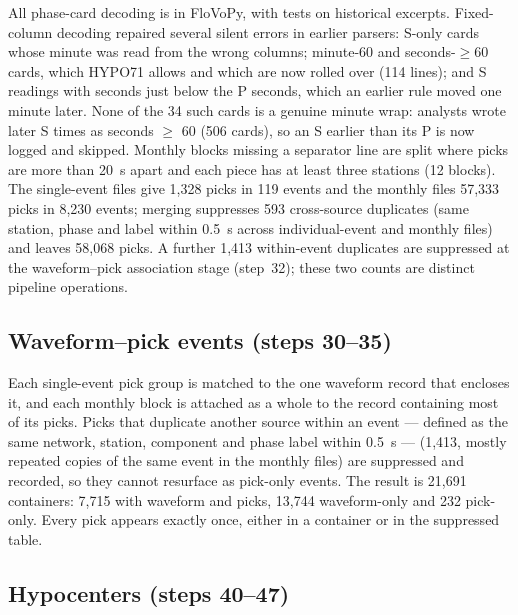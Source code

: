 \documentclass[linenum]{SSA-SRL}
\begin{document}
All phase-card decoding is in FloVoPy, with tests on historical excerpts. Fixed-column decoding repaired several silent errors in earlier parsers: S-only cards whose minute was read from the wrong columns; minute-60 and seconds-$\ge$60 cards, which HYPO71 allows and which are now rolled over (114 lines); and S readings with seconds just below the P seconds, which an earlier rule moved one minute later. None of the 34 such cards is a genuine minute wrap: analysts wrote later S times as seconds $\ge$ 60 (506 cards), so an S earlier than its P is now logged and skipped. Monthly blocks missing a separator line are split where picks are more than 20~s apart and each piece has at least three stations (12 blocks). The single-event files give 1,328 picks in 119 events and the monthly files 57,333 picks in 8,230 events; merging suppresses 593 cross-source duplicates (same station, phase and label within 0.5~s across individual-event and monthly files) and leaves 58,068 picks. A further 1,413 within-event duplicates are suppressed at the waveform--pick association stage (step~32); these two counts are distinct pipeline operations.

\subsection{Waveform--pick events (steps 30--35)}

Each single-event pick group is matched to the one waveform record that encloses it, and each monthly block is attached as a whole to the record containing most of its picks. Picks that duplicate another source within an event --- defined as the same network, station, component and phase label within 0.5~s --- (1,413, mostly repeated copies of the same event in the monthly files) are suppressed and recorded, so they cannot resurface as pick-only events. The result is 21,691 containers: 7,715 with waveform and picks, 13,744 waveform-only and 232 pick-only. Every pick appears exactly once, either in a container or in the suppressed table.

\subsection{Hypocenters (steps 40--47)}
\end{document}
